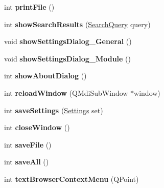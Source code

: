 \begin{CompactItemize}
\item 
\hypertarget{classMainWindow_85992dd25043405c44bca262fdbef7a2}{
int \textbf{printFile} ()}
\label{classMainWindow_85992dd25043405c44bca262fdbef7a2}

\item 
\hypertarget{classMainWindow_71e99b36a6593f190cc999f476e8e851}{
int \textbf{showSearchResults} (\hyperlink{classSearchQuery}{SearchQuery} query)}
\label{classMainWindow_71e99b36a6593f190cc999f476e8e851}

\item 
\hypertarget{classMainWindow_1c14a341d9d6b8c3b76d7c4a838463d8}{
void \textbf{showSettingsDialog\_\-General} ()}
\label{classMainWindow_1c14a341d9d6b8c3b76d7c4a838463d8}

\item 
\hypertarget{classMainWindow_c4d16cb0945152f7be27dcac8f85703d}{
void \textbf{showSettingsDialog\_\-Module} ()}
\label{classMainWindow_c4d16cb0945152f7be27dcac8f85703d}

\item 
\hypertarget{classMainWindow_2b395ebcc7a8e3af8f56e3b8d8357848}{
int \textbf{showAboutDialog} ()}
\label{classMainWindow_2b395ebcc7a8e3af8f56e3b8d8357848}

\item 
\hypertarget{classMainWindow_55a58d34ed3f997b831ae31f80df9021}{
int \textbf{reloadWindow} (QMdiSubWindow $\ast$window)}
\label{classMainWindow_55a58d34ed3f997b831ae31f80df9021}

\item 
\hypertarget{classMainWindow_2ab00e631b1a23db54ae07d6f0ef2651}{
int \textbf{saveSettings} (\hyperlink{classSettings}{Settings} set)}
\label{classMainWindow_2ab00e631b1a23db54ae07d6f0ef2651}

\item 
\hypertarget{classMainWindow_e9939f50c99d13acc78ca5a3d330e19b}{
int \textbf{closeWindow} ()}
\label{classMainWindow_e9939f50c99d13acc78ca5a3d330e19b}

\item 
\hypertarget{classMainWindow_ead8660a76704ccb79582845a1513543}{
int \textbf{saveFile} ()}
\label{classMainWindow_ead8660a76704ccb79582845a1513543}

\item 
\hypertarget{classMainWindow_019b36e5a30cd59c4e0998f72798954b}{
int \textbf{saveAll} ()}
\label{classMainWindow_019b36e5a30cd59c4e0998f72798954b}

\item 
\hypertarget{classMainWindow_1430f4884f762798430acdf3f4817921}{
int \textbf{textBrowserContextMenu} (QPoint)}
\label{classMainWindow_1430f4884f762798430acdf3f4817921}


\end{CompactItemize}
